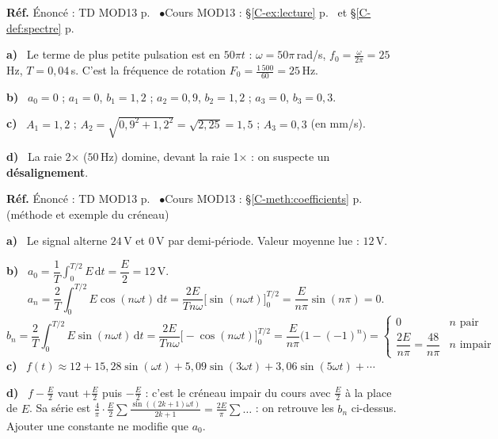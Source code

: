 \documentclass[a4paper,11pt]{article}
\newcommand{\cours}[1]{§\ref{C-#1} p.~\pageref{C-#1}}
\newcommand{\source}[2]{{\footnotesize\color{uimmgray}\textbf{Réf.} \enspace Énoncé : TD MOD13 p.~\pageref{T-#1} \enspace$\bullet$\enspace Cours MOD13 : #2}\par\smallskip}
\newcommand{\q}[1]{\textbf{\color{uimmblue}#1}\ }
\begin{document}
\begin{correction}
\source{exo:6}{\cours{ex:lecture} et \cours{def:spectre}}
\q{a)} Le terme de plus petite pulsation est en $50\pi t$ : $\omega = 50\pi$\,rad/s, $f_0 = \frac{\omega}{2\pi} = 25$\,Hz, $T = 0{,}04$\,s. C'est la fréquence de rotation $F_0 = \frac{1\,500}{60} = 25$\,Hz.

\q{b)} $a_0 = 0$ ; $a_1 = 0$, $b_1 = 1{,}2$ ; $a_2 = 0{,}9$, $b_2 = 1{,}2$ ; $a_3 = 0$, $b_3 = 0{,}3$.

\q{c)} $A_1 = 1{,}2$ ; $A_2 = \sqrt{0{,}9^2 + 1{,}2^2} = \sqrt{2{,}25} = 1{,}5$ ; $A_3 = 0{,}3$ (en mm/s).
\begin{center}
\end{center}
\q{d)} La raie 2× ($50$\,Hz) domine, devant la raie 1× : on suspecte un \textbf{désalignement}.
\end{correction}

\begin{correction}
\source{exo:7}{\cours{meth:coefficients} (méthode et exemple du créneau)}
\q{a)} Le signal alterne $24$\,V et $0$\,V par demi-période. Valeur moyenne lue : $12$\,V.

\q{b)} $a_0 = \dfrac1T\displaystyle\int_0^{T/2}E\,\mathrm dt = \dfrac E2 = 12$\,V.
\[
a_n = \frac2T\int_0^{T/2}E\cos(n\omega t)\,\mathrm dt = \frac{2E}{Tn\omega}\big[\sin(n\omega t)\big]_0^{T/2} = \frac{E}{n\pi}\sin(n\pi) = 0.
\]
\[
b_n = \frac2T\int_0^{T/2}E\sin(n\omega t)\,\mathrm dt = \frac{2E}{Tn\omega}\big[-\cos(n\omega t)\big]_0^{T/2} = \frac{E}{n\pi}\big(1 - (-1)^n\big)
= \begin{cases} 0 & n \text{ pair}\\[2pt] \dfrac{2E}{n\pi} = \dfrac{48}{n\pi} & n \text{ impair}\end{cases}
\]
\q{c)} $f(t) \approx 12 + 15{,}28\sin(\omega t) + 5{,}09\sin(3\omega t) + 3{,}06\sin(5\omega t) + \cdots$

\q{d)} $f - \frac E2$ vaut $+\frac E2$ puis $-\frac E2$ : c'est le créneau impair du cours avec $\frac E2$ à la place de $E$. Sa série est $\frac{4}{\pi}\cdot\frac E2\sum\frac{\sin((2k+1)\omega t)}{2k+1} = \frac{2E}{\pi}\sum\dots$ : on retrouve les $b_n$ ci-dessus. Ajouter une constante ne modifie que $a_0$.
\end{correction}
\end{document}
